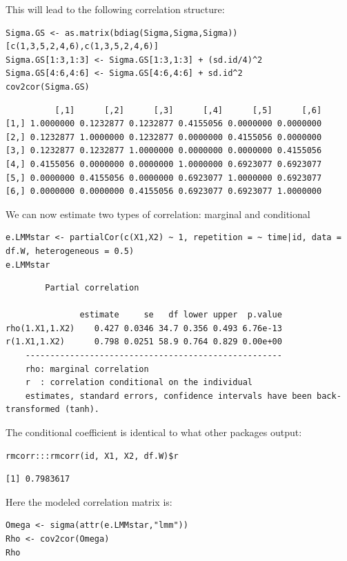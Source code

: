 \documentclass[12pt]{article}
\begin{document}
This will lead to the following correlation structure:
\lstset{language=r,label= ,caption= ,captionpos=b,numbers=none}
\begin{lstlisting}
Sigma.GS <- as.matrix(bdiag(Sigma,Sigma,Sigma))[c(1,3,5,2,4,6),c(1,3,5,2,4,6)]
Sigma.GS[1:3,1:3] <- Sigma.GS[1:3,1:3] + (sd.id/4)^2
Sigma.GS[4:6,4:6] <- Sigma.GS[4:6,4:6] + sd.id^2
cov2cor(Sigma.GS)
\end{lstlisting}

\begin{verbatim}
          [,1]      [,2]      [,3]      [,4]      [,5]      [,6]
[1,] 1.0000000 0.1232877 0.1232877 0.4155056 0.0000000 0.0000000
[2,] 0.1232877 1.0000000 0.1232877 0.0000000 0.4155056 0.0000000
[3,] 0.1232877 0.1232877 1.0000000 0.0000000 0.0000000 0.4155056
[4,] 0.4155056 0.0000000 0.0000000 1.0000000 0.6923077 0.6923077
[5,] 0.0000000 0.4155056 0.0000000 0.6923077 1.0000000 0.6923077
[6,] 0.0000000 0.0000000 0.4155056 0.6923077 0.6923077 1.0000000
\end{verbatim}


We can now estimate two types of correlation: marginal and conditional
\lstset{language=r,label= ,caption= ,captionpos=b,numbers=none}
\begin{lstlisting}
e.LMMstar <- partialCor(c(X1,X2) ~ 1, repetition = ~ time|id, data = df.W, heterogeneous = 0.5)
e.LMMstar
\end{lstlisting}

\begin{verbatim}
		Partial correlation 

               estimate     se   df lower upper  p.value
rho(1.X1,1.X2)    0.427 0.0346 34.7 0.356 0.493 6.76e-13
r(1.X1,1.X2)      0.798 0.0251 58.9 0.764 0.829 0.00e+00
	----------------------------------------------------
	rho: marginal correlation 
	r  : correlation conditional on the individual 
	estimates, standard errors, confidence intervals have been back-transformed (tanh).
\end{verbatim}


The conditional coefficient is identical to what other packages output:
\lstset{language=r,label= ,caption= ,captionpos=b,numbers=none}
\begin{lstlisting}
rmcorr:::rmcorr(id, X1, X2, df.W)$r
\end{lstlisting}

\begin{verbatim}
[1] 0.7983617
\end{verbatim}


Here the modeled correlation matrix is:
\lstset{language=r,label= ,caption= ,captionpos=b,numbers=none}
\begin{lstlisting}
Omega <- sigma(attr(e.LMMstar,"lmm"))
Rho <- cov2cor(Omega)
Rho
\end{lstlisting}
\end{document}

